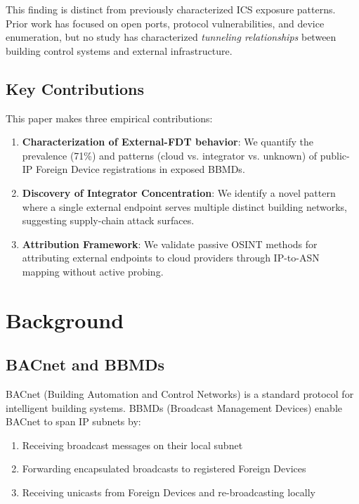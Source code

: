 \documentclass[11pt,a4paper]{article}
\begin{document}
This finding is distinct from previously characterized ICS exposure patterns.
Prior work has focused on open ports\cite{tank2017sok}, protocol vulnerabilities\cite{bradley2020industrial}, 
and device enumeration\cite{shodanics}, but no study has characterized \emph{tunneling relationships}
between building control systems and external infrastructure.

\subsection{Key Contributions}

This paper makes three empirical contributions:

\begin{enumerate}
  \item \textbf{Characterization of External-FDT behavior}: We quantify the 
    prevalence (71\%) and patterns (cloud vs. integrator vs. unknown) of 
    public-IP Foreign Device registrations in exposed BBMDs.
    
  \item \textbf{Discovery of Integrator Concentration}: We identify a 
    novel pattern where a single external endpoint serves multiple 
    distinct building networks, suggesting supply-chain attack surfaces.
    
  \item \textbf{Attribution Framework}: We validate passive OSINT methods for 
    attributing external endpoints to cloud providers through IP-to-ASN 
    mapping without active probing.
\end{enumerate}

\section{Background}
\label{sec:background}

\subsection{BACnet and BBMDs}

BACnet (Building Automation and Control Networks) is a standard protocol 
for intelligent building systems. BBMDs (Broadcast Management Devices) 
enable BACnet to span IP subnets by:\cite{newman2009bacnet}

\begin{enumerate}
  \item Receiving broadcast messages on their local subnet
  \item Forwarding encapsulated broadcasts to registered Foreign Devices
  \item Receiving unicasts from Foreign Devices and re-broadcasting locally
\end{enumerate}
\end{document}
